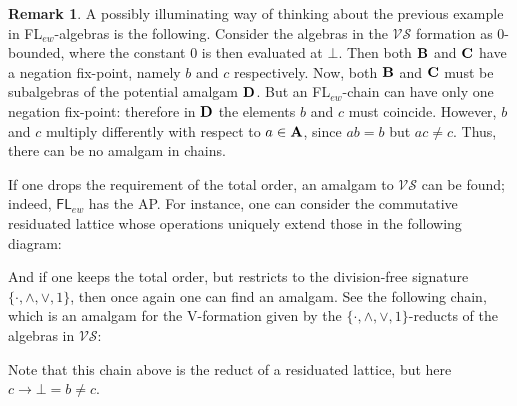 \documentclass{amsart}
\theoremstyle{definition}
\newtheorem{remark}[theorem]{Remark}
\numberwithin{equation}{section}
\newcommand{\alg}[1]{{\textbf{\upshape #1}}}  %
\newcommand{\vv}[1]{\mathsf {#1}}
\newcommand{\VS}{\mathcal{VS}}
\begin{document}
\begin{remark}
	A possibly illuminating way of thinking about the previous example in FL$_{ew}$-algebras is the following. Consider the algebras in the $\VS$ formation as $0$-bounded, where the constant $0$ is then evaluated at $\bot$. Then both $\alg B$ and $\alg C$ have a negation fix-point, namely $b$ and $c$ respectively. Now, both $\alg B$ and $\alg C$ must be subalgebras of the potential amalgam $\alg D$. But an FL$_{ew}$-chain can have only one negation fix-point: therefore in $\alg D$ the elements $b$ and $c$ must coincide. However, $b$ and $c$ multiply differently with respect to $a \in \alg A$, since $ab = b$ but $ac \neq c$. Thus, there can be no amalgam in chains. 
\end{remark}
If one drops the requirement of the total order, an amalgam to $\VS$ can be found;
indeed, $\vv{FL}_{ew}$ has the AP. For instance, one can consider the commutative residuated lattice whose operations uniquely extend those in the following diagram:
\begin{center}
\end{center}
And if one keeps the total order, but restricts to the division-free signature $\{\cdot, \land, \lor, 1\}$, then once again one can find an amalgam. See the following chain, which is an amalgam for the V-formation given by the $\{\cdot, \land, \lor, 1\}$-reducts of the algebras in $\VS$:
\begin{center}
\end{center} 
Note that this chain above is the reduct of a residuated lattice, but here $c \to \bot = b \neq c$.
\end{document}
